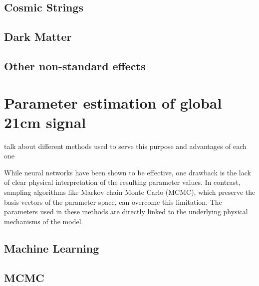 \documentclass[12pt, TexShade, letterpaper]{report}
\begin{document}
\subsection{Cosmic Strings}
\subsection{Dark Matter}
\subsection{Other non-standard effects}
\section{Parameter estimation of global 21cm signal}
\label{chap:global21cm,sub:parameter_estimation}
talk about different methods used to serve this purpose and advantages of each one\par
While neural networks have been shown to be effective, one drawback is the lack of clear physical interpretation of the resulting parameter values. In contrast, sampling algorithms like Markov chain Monte Carlo (MCMC), which preserve the basis vectors of the parameter space, can overcome this limitation. The parameters used in these methods are directly linked to the underlying physical mechanisms of the model.
\subsection{Machine Learning}
\subsection{MCMC}
\end{document}
